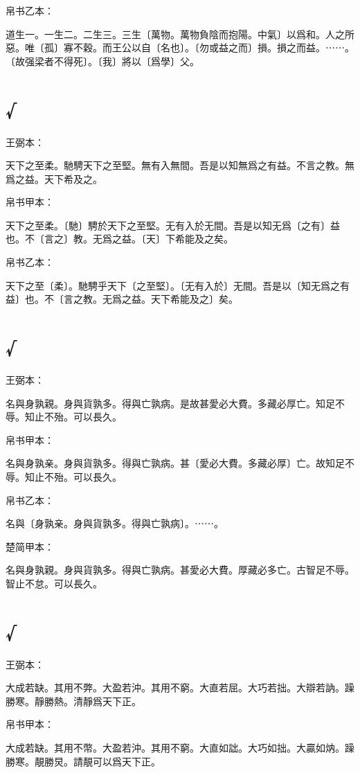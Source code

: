 \documentclass[a5paper]{ctexbook}
\begin{document}
    帛书乙本：

    道生一。一生二。二生三。三生〔萬物。萬物負陰而抱陽。中氣〕以爲和。人之所惡。唯〔孤〕寡不穀。而王公以自〔名也〕。〔勿或益之而〕損。損之而益。⋯⋯。〔故强梁者不得死〕。〔我〕將以〔爲學〕父。

    \chapter{√}
    王弼本：

    天下之至柔。馳騁天下之至堅。無有入無間。吾是以知無爲之有益。不言之教。無爲之益。天下希及之。

    
    帛书甲本：

    天下之至柔。〔馳〕騁於天下之至堅。无有入於无間。吾是以知无爲〔之有〕益也。不〔言之〕教。无爲之益。〔天〕下希能及之矣。

    帛书乙本：

    天下之至〔柔〕。馳騁乎天下〔之至堅〕。〔无有入於〕无間。吾是以〔知无爲之有益〕也。不〔言之教。无爲之益。天下希能及之〕矣。

    \chapter{√}
    王弼本：

    名與身孰親。身與貨孰多。得與亡孰病。是故甚愛必大費。多藏必厚亡。知足不辱。知止不殆。可以長久。

    
    帛书甲本：

    名與身孰亲。身與貨孰多。得與亡孰病。甚〔愛必大費。多藏必厚〕亡。故知足不辱。知止不殆。可以長久。

    帛书乙本：

    名與〔身孰亲。身與貨孰多。得與亡孰病〕。⋯⋯。

    楚简甲本：

    名與身孰親。身與貨孰多。得與亡孰病。甚愛必大費。厚藏必多亡。古智足不辱。智止不怠。可以長久。

    \chapter{√}
    王弼本：

    大成若缺。其用不弊。大盈若沖。其用不窮。大直若屈。大巧若拙。大辯若訥。躁勝寒。靜勝熱。清靜爲天下正。


    帛书甲本：

    大成若缺。其用不幣。大盈若沖。其用不窮。大直如詘。大巧如拙。大贏如㶧。躁勝寒。靚勝炅。請靚可以爲天下正。
\end{document}
